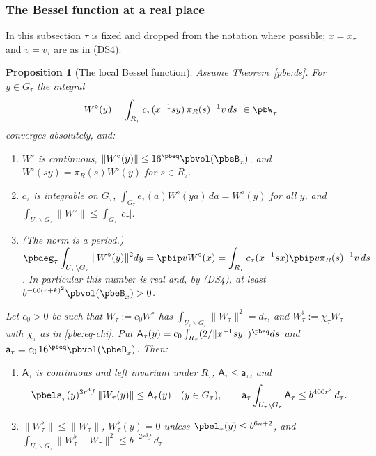 \documentclass[10pt]{amsart}
\newtheorem{proposition}[theorem]{Proposition}
\theoremstyle{definition}
\theoremstyle{remark}
\begin{document}
\subsubsection{The Bessel function at a real place}\label{pbe:ss-local}

In this subsection $\tau$ is fixed and dropped from the notation where possible; $x=x_\tau$ and
$v=v_\tau$ are as in \textup{(DS4)}.

\begin{proposition}[The local Bessel function]\label{pbe:local}
Assume Theorem~\ref{pbe:ds}. For $y\in G_\tau$ the integral
\[
W^\circ(y)=\int_{R_\tau}c_\tau(x^{-1}sy)\,\pi_R(s)^{-1}v\,ds\ \in\pbW_\tau
\]
converges absolutely, and:
\begin{enumerate}
\item[(a)] $W^\circ$ is continuous, $\|W^\circ(y)\|\le16^{\pbeq}\pbvol(\pbeB_x)$, and $W^\circ(sy)=
\pi_R(s)W^\circ(y)$ for $s\in R_\tau$.
\item[(b)] $c_\tau$ is integrable on $G_\tau$, $\int_{G_\tau}e_\tau(a)W^\circ(ya)\,da=W^\circ(y)$ for
all $y$, and $\int_{U_\tau\backslash G_\tau}\|W^\circ\|\le\int_{G_\tau}|c_\tau|$.
\item[(c)] \emph{(The norm is a period.)} $\displaystyle\pbdeg_\tau\int_{U_\tau\backslash G_\tau}\|W^
\circ(y)\|^2dy=\pbip v{W^\circ(x)}=\int_{R_\tau}c_\tau(x^{-1}sx)\pbip v{\pi_R(s)^{-1}v}\,ds$. In
particular this number is real and, by \textup{(DS4)}, at least $b^{-60(r+k)^2}\pbvol(\pbeB_x)>0$.
\end{enumerate}
Let $c_0>0$ be such that $W_\tau:=c_0W^\circ$ has $\int_{U_\tau\backslash G_\tau}\|W_\tau\|^2=d_\tau$,
and $W_\tau^\flat:=\chi_\tau W_\tau$ with $\chi_\tau$ as in \eqref{pbe:eq-chi}. Put
$\mathsf A_\tau(y)=c_0\int_{R_\tau}(2/\|x^{-1}sy\|)^{\pbeq}ds$ and $\mathsf a_\tau=c_0\,16^{\pbeq}\pbvol(
\pbeB_x)$. Then:
\begin{enumerate}
\item[(d)] $\mathsf A_\tau$ is continuous and left invariant under $R_\tau$, $\mathsf A_\tau\le\mathsf
a_\tau$, and
\[
\pbels_\tau(y)^{3r^3f}\,\|W_\tau(y)\|\le\mathsf A_\tau(y)\quad(y\in G_\tau),\qquad\mathsf a_\tau\int_{
U_\tau\backslash G_\tau}\mathsf A_\tau\le b^{400r^2}\,d_\tau .
\]
\item[(e)] $\|W^\flat_\tau\|\le\|W_\tau\|$, $W^\flat_\tau(y)=0$ unless $\pbel_\tau(y)\le b^{6n+2}$, and
$\displaystyle\int_{U_\tau\backslash G_\tau}\|W_\tau^\flat-W_\tau\|^2\le b^{-2r^3f}\,d_\tau$.
\end{enumerate}
\end{proposition}
\end{document}
